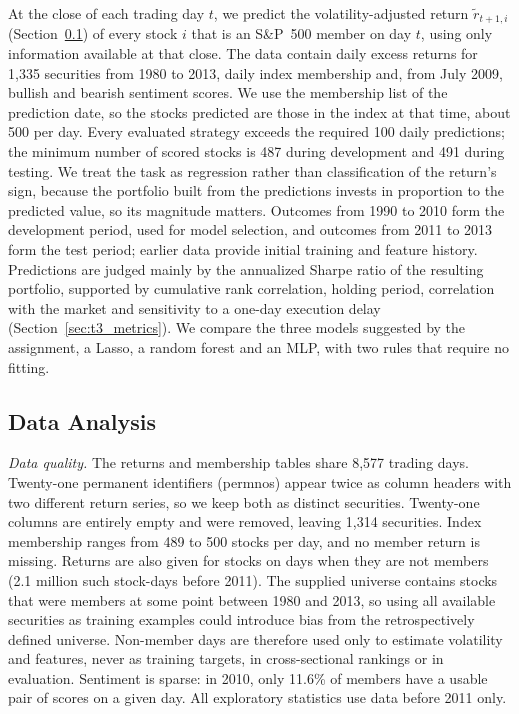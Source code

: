 \documentclass[conference]{IEEEtran}
\begin{document}
At the close of each trading day $t$, we predict the volatility-adjusted return $\tilde r_{t+1,i}$ (Section~\ref{sec:t3_analysis}) of every stock $i$ that is an S\&P~500 member on day $t$, using only information available at that close. The data contain daily excess returns for 1,335 securities from 1980 to 2013, daily index membership and, from July 2009, bullish and bearish sentiment scores. We use the membership list of the prediction date, so the stocks predicted are those in the index at that time, about 500 per day. Every evaluated strategy exceeds the required 100 daily predictions; the minimum number of scored stocks is 487 during development and 491 during testing. We treat the task as regression rather than classification of the return's sign, because the portfolio built from the predictions invests in proportion to the predicted value, so its magnitude matters. Outcomes from 1990 to 2010 form the development period, used for model selection, and outcomes from 2011 to 2013 form the test period; earlier data provide initial training and feature history. Predictions are judged mainly by the annualized Sharpe ratio of the resulting portfolio, supported by cumulative rank correlation, holding period, correlation with the market and sensitivity to a one-day execution delay (Section~\ref{sec:t3_metrics}). We compare the three models suggested by the assignment, a Lasso, a random forest and an MLP, with two rules that require no fitting.

\subsection{Data Analysis}
\label{sec:t3_analysis}

\textit{Data quality.} The returns and membership tables share 8,577 trading days. Twenty-one permanent identifiers (permnos) appear twice as column headers with two different return series, so we keep both as distinct securities. Twenty-one columns are entirely empty and were removed, leaving 1,314 securities. Index membership ranges from 489 to 500 stocks per day, and no member return is missing. Returns are also given for stocks on days when they are not members (2.1 million such stock-days before 2011). The supplied universe contains stocks that were members at some point between 1980 and 2013, so using all available securities as training examples could introduce bias from the retrospectively defined universe. Non-member days are therefore used only to estimate volatility and features, never as training targets, in cross-sectional rankings or in evaluation. Sentiment is sparse: in 2010, only 11.6\% of members have a usable pair of scores on a given day. All exploratory statistics use data before 2011 only.
\end{document}
